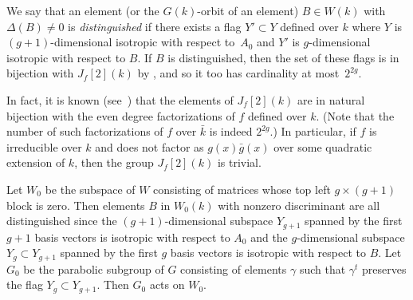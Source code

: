 \documentclass[11pt]{article}
\begin{document}
We say that an element (or the $G(k)$-orbit of an element) $B\in W(k)$ with $\Delta(B)\neq 0$ is
{\it distinguished} if there exists a flag $Y'\subset Y$ defined over
$k$ where $Y$ is $(g+1)$-dimensional isotropic with respect to~$A_0$
and $Y'$ is $g$-dimensional isotropic with respect to $B$. If $B$ is
distinguished, then the set of these flags is in bijection with
$J_f[2](k)$ by \cite[Proposition~2.32]{W},  and so it too has cardinality at most~$2^{2g}$.

In fact, it is known (see~\cite[Proposition~22]{BGWhyper}) that the elements of $J_f[2](k)$ are in natural bijection with the even degree factorizations of $f$ defined over $k$.  (Note that the number of such factorizations of $f$ over $\bar k$ is indeed $2^{2g}$.) In particular, if $f$ is irreducible over $k$ and does not factor as $g(x)\bar g(x)$ over some quadratic extension of $k$, then the group $J_f[2](k)$ is trivial.

Let $W_0$ be the subspace of $W$ consisting of matrices whose top left
$g\times (g+1)$ block is zero. Then elements $B$ in $W_0(k)$ with
nonzero discriminant are all distinguished since the $(g+1)$-dimensional
subspace $Y_{g+1}$ spanned by the first $g+1$ basis vectors is
isotropic with respect to $A_0$ and the $g$-dimensional subspace
$Y_g\subset Y_{g+1}$ spanned by the first $g$ basis vectors is
isotropic with respect to $B$.
Let $G_0$ be the parabolic subgroup of
$G$ consisting of elements $\gamma$ such that $\gamma^t$ preserves the
flag $Y_g\subset Y_{g+1}$. Then $G_0$ acts on $W_0$.
\end{document}
